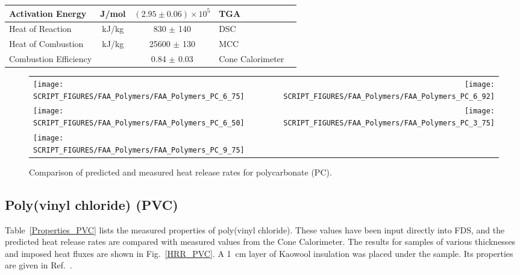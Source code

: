 \begin{table}[h!]
\begin{center}
\begin{tabular}{|l|c|c|l|l|}
Activation Energy           & J/mol       & $(2.95 \pm 0.06) \times 10^{5}$   & TGA                   &  \cite{Stoliarov:CF2010}                  \\ \hline
Heat of Reaction            & kJ/kg         & 830 $\pm$ 140                     & DSC                   &  \cite{Stoliarov:PDS2008}                 \\ \hline
Heat of Combustion          & kJ/kg         & 25600 $\pm$ 130                   & MCC                   &  \cite{Stoliarov:CF2010}                  \\ \hline
Combustion Efficiency       &               & 0.84 $\pm$ 0.03                   & Cone Calorimeter      &  \cite{Stoliarov:CF2010}                  \\ \hline
\end{tabular}
\end{center}
\label{Properties_PC}
\end{table}

\begin{figure}[p]
\begin{tabular*}{\textwidth}{l@{\extracolsep{\fill}}r}
\texttt{[image: SCRIPT\_FIGURES/FAA\_Polymers/FAA\_Polymers\_PC\_6\_75]} &
\texttt{[image: SCRIPT\_FIGURES/FAA\_Polymers/FAA\_Polymers\_PC\_6\_92]} \\
\texttt{[image: SCRIPT\_FIGURES/FAA\_Polymers/FAA\_Polymers\_PC\_6\_50]} &
\texttt{[image: SCRIPT\_FIGURES/FAA\_Polymers/FAA\_Polymers\_PC\_3\_75]} \\
\texttt{[image: SCRIPT\_FIGURES/FAA\_Polymers/FAA\_Polymers\_PC\_9\_75]} &
\end{tabular*}
\caption[Heat release rate of polycarbonate (PC)]
{Comparison of predicted and measured heat release rates for polycarbonate (PC).}
\label{HRR_PC}
\end{figure}

\clearpage


\subsection{Poly(vinyl chloride) (PVC)}

Table~\ref{Properties_PVC} lists the measured properties of poly(vinyl chloride). These values have been input directly into FDS, and the predicted heat release rates are compared with measured values from the Cone Calorimeter. The results for samples of various thicknesses and imposed heat fluxes are shown in Fig.~\ref{HRR_PVC}. A 1~cm layer of Kaowool insulation was placed under the sample. Its properties are given in Ref.~\cite{Stoliarov:CF2010}.

